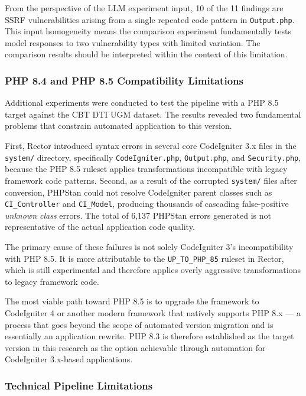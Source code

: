 From the perspective of the LLM experiment input, 10 of the 11 findings are SSRF vulnerabilities arising from a single repeated code pattern in \texttt{Output.php}. This input homogeneity means the comparison experiment fundamentally tests model responses to two vulnerability types with limited variation. The comparison results should be interpreted within the context of this limitation.

\subsubsection{PHP 8.4 and PHP 8.5 Compatibility Limitations}

Additional experiments were conducted to test the pipeline with a PHP 8.5 target against the CBT DTI UGM dataset. The results revealed two fundamental problems that constrain automated application to this version.

First, Rector introduced syntax errors in several core CodeIgniter 3.x files in the \texttt{system/} directory, specifically \texttt{CodeIgniter.php}, \texttt{Output.php}, and \texttt{Security.php}, because the PHP 8.5 ruleset applies transformations incompatible with legacy framework code patterns. Second, as a result of the corrupted \texttt{system/} files after conversion, PHPStan could not resolve CodeIgniter parent classes such as \texttt{CI\_Controller} and \texttt{CI\_Model}, producing thousands of cascading false-positive \textit{unknown class} errors. The total of 6,137 PHPStan errors generated is not representative of the actual application code quality.

The primary cause of these failures is not solely CodeIgniter 3's incompatibility with PHP 8.5. It is more attributable to the \texttt{UP\_TO\_PHP\_85} ruleset in Rector, which is still experimental and therefore applies overly aggressive transformations to legacy framework code.

The most viable path toward PHP 8.5 is to upgrade the framework to CodeIgniter 4 or another modern framework that natively supports PHP 8.x — a process that goes beyond the scope of automated version migration and is essentially an application rewrite. PHP 8.3 is therefore established as the target version in this research as the option achievable through automation for CodeIgniter 3.x-based applications.

\subsubsection{Technical Pipeline Limitations}
\label{sec:keterbatasan}

